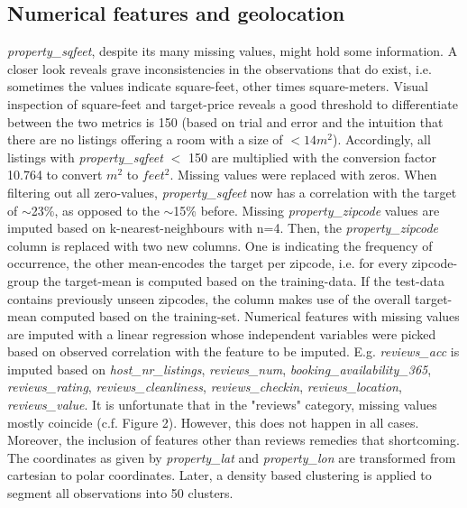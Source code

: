 \documentclass[11pt, oneside]{article}   	%
\begin{document}
\subsection{Numerical features and geolocation}
\textit{property\_sqfeet}, despite its many missing values, might hold some information. A closer look reveals grave inconsistencies in the observations that do exist, i.e. sometimes the values indicate square-feet, other times square-meters. Visual inspection of square-feet and target-price reveals a good threshold to differentiate between the two metrics is 150 (based on trial and error and the intuition that there are no listings offering a room with a size of $<14m^2$). Accordingly, all listings with \textit{property\_sqfeet} $<$ 150 are multiplied with the conversion factor 10.764 to convert $m^2$ to $feet^2$.  Missing values were replaced with zeros. When filtering out all zero-values, \textit{property\_sqfeet} now has a correlation with the target of $\sim$23\%, as opposed to the $\sim$15\% before.\newline
\newline
\indent Missing \textit{property\_zipcode} values are imputed based on k-nearest-neighbours with n=4. Then, the \textit{property\_zipcode} column is replaced with two new columns. One is indicating the frequency of occurrence, the other mean-encodes the target per zipcode, i.e. for every zipcode-group the target-mean is computed based on the training-data. If the test-data contains previously unseen zipcodes, the column makes use of the overall target-mean computed based on the training-set.\newline
\newline
\indent Numerical features with missing values are imputed with a linear regression whose independent variables were picked based on observed correlation with the feature to be imputed. E.g. \textit{reviews\_acc} is imputed based on \textit{host\_nr\_listings}, \textit{reviews\_num}, \textit{booking\_availability\_365}, \textit{reviews\_rating}, \textit{reviews\_cleanliness}, \textit{reviews\_checkin}, \textit{reviews\_location}, \textit{reviews\_value}. It is unfortunate that in the "reviews" category, missing values mostly coincide (c.f. Figure 2). However, this does not happen in all cases. Moreover, the inclusion of features other than reviews remedies that shortcoming. 
\newline
\indent The coordinates as given by \textit{property\_lat} and \textit{property\_lon} are transformed from cartesian to polar coordinates. Later, a density based clustering is applied to segment all observations into 50 clusters.
\newline
\end{document}
